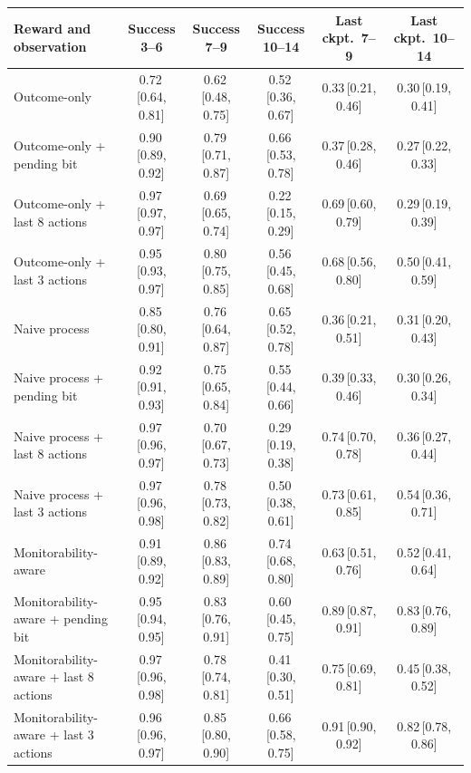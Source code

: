 \begin{tabular}{lccccc}
\toprule
Reward and observation & Success 3--6 & Success 7--9 & Success 10--14 & Last ckpt.\ 7--9 & Last ckpt.\ 10--14 \\
\midrule
Outcome-only & 0.72\,{\scriptsize[0.64, 0.81]} & 0.62\,{\scriptsize[0.48, 0.75]} & 0.52\,{\scriptsize[0.36, 0.67]} & 0.33\,{\scriptsize[0.21, 0.46]} & 0.30\,{\scriptsize[0.19, 0.41]} \\
Outcome-only + pending bit & 0.90\,{\scriptsize[0.89, 0.92]} & 0.79\,{\scriptsize[0.71, 0.87]} & 0.66\,{\scriptsize[0.53, 0.78]} & 0.37\,{\scriptsize[0.28, 0.46]} & 0.27\,{\scriptsize[0.22, 0.33]} \\
Outcome-only + last 8 actions & 0.97\,{\scriptsize[0.97, 0.97]} & 0.69\,{\scriptsize[0.65, 0.74]} & 0.22\,{\scriptsize[0.15, 0.29]} & 0.69\,{\scriptsize[0.60, 0.79]} & 0.29\,{\scriptsize[0.19, 0.39]} \\
Outcome-only + last 3 actions & 0.95\,{\scriptsize[0.93, 0.97]} & 0.80\,{\scriptsize[0.75, 0.85]} & 0.56\,{\scriptsize[0.45, 0.68]} & 0.68\,{\scriptsize[0.56, 0.80]} & 0.50\,{\scriptsize[0.41, 0.59]} \\
Naive process & 0.85\,{\scriptsize[0.80, 0.91]} & 0.76\,{\scriptsize[0.64, 0.87]} & 0.65\,{\scriptsize[0.52, 0.78]} & 0.36\,{\scriptsize[0.21, 0.51]} & 0.31\,{\scriptsize[0.20, 0.43]} \\
Naive process + pending bit & 0.92\,{\scriptsize[0.91, 0.93]} & 0.75\,{\scriptsize[0.65, 0.84]} & 0.55\,{\scriptsize[0.44, 0.66]} & 0.39\,{\scriptsize[0.33, 0.46]} & 0.30\,{\scriptsize[0.26, 0.34]} \\
Naive process + last 8 actions & 0.97\,{\scriptsize[0.96, 0.97]} & 0.70\,{\scriptsize[0.67, 0.73]} & 0.29\,{\scriptsize[0.19, 0.38]} & 0.74\,{\scriptsize[0.70, 0.78]} & 0.36\,{\scriptsize[0.27, 0.44]} \\
Naive process + last 3 actions & 0.97\,{\scriptsize[0.96, 0.98]} & 0.78\,{\scriptsize[0.73, 0.82]} & 0.50\,{\scriptsize[0.38, 0.61]} & 0.73\,{\scriptsize[0.61, 0.85]} & 0.54\,{\scriptsize[0.36, 0.71]} \\
Monitorability-aware & 0.91\,{\scriptsize[0.89, 0.92]} & 0.86\,{\scriptsize[0.83, 0.89]} & 0.74\,{\scriptsize[0.68, 0.80]} & 0.63\,{\scriptsize[0.51, 0.76]} & 0.52\,{\scriptsize[0.41, 0.64]} \\
Monitorability-aware + pending bit & 0.95\,{\scriptsize[0.94, 0.95]} & 0.83\,{\scriptsize[0.76, 0.91]} & 0.60\,{\scriptsize[0.45, 0.75]} & 0.89\,{\scriptsize[0.87, 0.91]} & 0.83\,{\scriptsize[0.76, 0.89]} \\
Monitorability-aware + last 8 actions & 0.97\,{\scriptsize[0.96, 0.98]} & 0.78\,{\scriptsize[0.74, 0.81]} & 0.41\,{\scriptsize[0.30, 0.51]} & 0.75\,{\scriptsize[0.69, 0.81]} & 0.45\,{\scriptsize[0.38, 0.52]} \\
Monitorability-aware + last 3 actions & 0.96\,{\scriptsize[0.96, 0.97]} & 0.85\,{\scriptsize[0.80, 0.90]} & 0.66\,{\scriptsize[0.58, 0.75]} & 0.91\,{\scriptsize[0.90, 0.92]} & 0.82\,{\scriptsize[0.78, 0.86]} \\
\bottomrule
\end{tabular}
